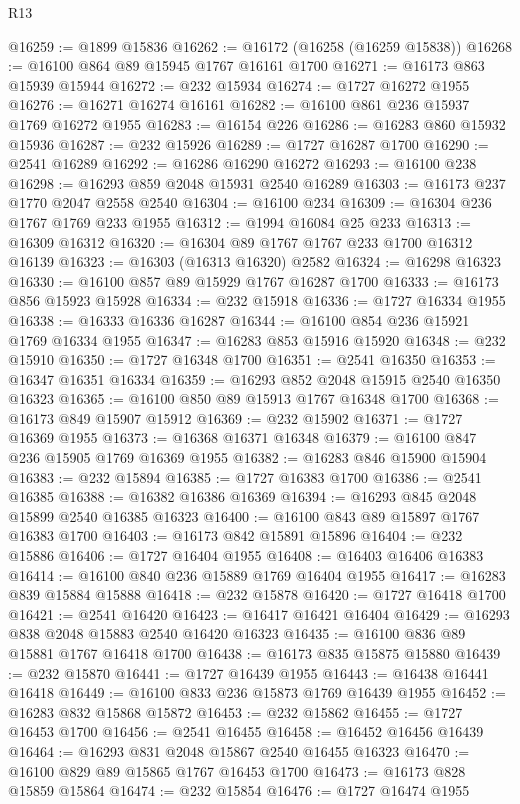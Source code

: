 \begin{lexlean}{R13}
\begin{coremodule}
@16259 := @1899 @15836
@16262 := @16172 (@16258 (@16259 @15838))
@16268 := @16100 @864 @89 @15945 @1767 @16161 @1700
@16271 := @16173 @863 @15939 @15944
@16272 := @232 @15934
@16274 := @1727 @16272 @1955
@16276 := @16271 @16274 @16161
@16282 := @16100 @861 @236 @15937 @1769 @16272 @1955
@16283 := @16154 @226
@16286 := @16283 @860 @15932 @15936
@16287 := @232 @15926
@16289 := @1727 @16287 @1700
@16290 := @2541 @16289
@16292 := @16286 @16290 @16272
@16293 := @16100 @238
@16298 := @16293 @859 @2048 @15931 @2540 @16289
@16303 := @16173 @237 @1770 @2047 @2558 @2540
@16304 := @16100 @234
@16309 := @16304 @236 @1767 @1769 @233 @1955
@16312 := @1994 @16084 @25 @233
@16313 := @16309 @16312
@16320 := @16304 @89 @1767 @1767 @233 @1700 @16312 @16139
@16323 := @16303 (@16313 @16320) @2582
@16324 := @16298 @16323
@16330 := @16100 @857 @89 @15929 @1767 @16287 @1700
@16333 := @16173 @856 @15923 @15928
@16334 := @232 @15918
@16336 := @1727 @16334 @1955
@16338 := @16333 @16336 @16287
@16344 := @16100 @854 @236 @15921 @1769 @16334 @1955
@16347 := @16283 @853 @15916 @15920
@16348 := @232 @15910
@16350 := @1727 @16348 @1700
@16351 := @2541 @16350
@16353 := @16347 @16351 @16334
@16359 := @16293 @852 @2048 @15915 @2540 @16350 @16323
@16365 := @16100 @850 @89 @15913 @1767 @16348 @1700
@16368 := @16173 @849 @15907 @15912
@16369 := @232 @15902
@16371 := @1727 @16369 @1955
@16373 := @16368 @16371 @16348
@16379 := @16100 @847 @236 @15905 @1769 @16369 @1955
@16382 := @16283 @846 @15900 @15904
@16383 := @232 @15894
@16385 := @1727 @16383 @1700
@16386 := @2541 @16385
@16388 := @16382 @16386 @16369
@16394 := @16293 @845 @2048 @15899 @2540 @16385 @16323
@16400 := @16100 @843 @89 @15897 @1767 @16383 @1700
@16403 := @16173 @842 @15891 @15896
@16404 := @232 @15886
@16406 := @1727 @16404 @1955
@16408 := @16403 @16406 @16383
@16414 := @16100 @840 @236 @15889 @1769 @16404 @1955
@16417 := @16283 @839 @15884 @15888
@16418 := @232 @15878
@16420 := @1727 @16418 @1700
@16421 := @2541 @16420
@16423 := @16417 @16421 @16404
@16429 := @16293 @838 @2048 @15883 @2540 @16420 @16323
@16435 := @16100 @836 @89 @15881 @1767 @16418 @1700
@16438 := @16173 @835 @15875 @15880
@16439 := @232 @15870
@16441 := @1727 @16439 @1955
@16443 := @16438 @16441 @16418
@16449 := @16100 @833 @236 @15873 @1769 @16439 @1955
@16452 := @16283 @832 @15868 @15872
@16453 := @232 @15862
@16455 := @1727 @16453 @1700
@16456 := @2541 @16455
@16458 := @16452 @16456 @16439
@16464 := @16293 @831 @2048 @15867 @2540 @16455 @16323
@16470 := @16100 @829 @89 @15865 @1767 @16453 @1700
@16473 := @16173 @828 @15859 @15864
@16474 := @232 @15854
@16476 := @1727 @16474 @1955

\end{coremodule}
\end{lexlean}
